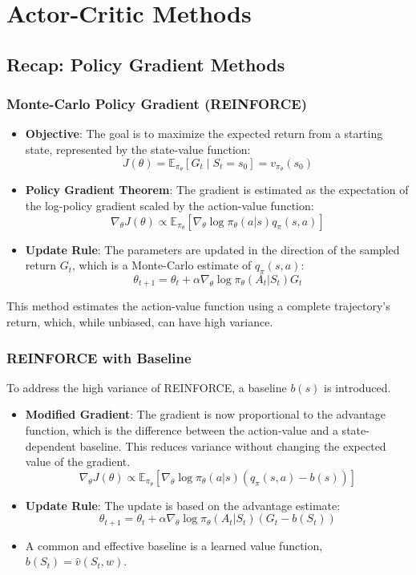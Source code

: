 \documentclass[12pt]{article}
\begin{document}
\section{Actor-Critic Methods }

\subsection{Recap: Policy Gradient Methods}

\subsubsection{Monte-Carlo Policy Gradient (REINFORCE)}
\begin{itemize}
    \item \textbf{Objective}: The goal is to maximize the expected return from a starting state, represented by the state-value function:
    $$ J(\theta) = \mathbb{E}_{\pi_\theta}[G_t \mid S_t = s_0] = v_{\pi_\theta}(s_0) $$
    \item \textbf{Policy Gradient Theorem}: The gradient is estimated as the expectation of the log-policy gradient scaled by the action-value function:
    $$ \nabla_\theta J(\theta) \propto \mathbb{E}_{\pi_\theta} [\nabla_\theta \log \pi_\theta(a|s) q_\pi(s,a)] $$
    \item \textbf{Update Rule}: The parameters are updated in the direction of the sampled return $G_t$, which is a Monte-Carlo estimate of $q_\pi(s,a)$:
    $$ \theta_{t+1} = \theta_t + \alpha \nabla_\theta \log \pi_\theta(A_t|S_t) G_t $$
\end{itemize}
This method estimates the action-value function using a complete trajectory's return, which, while unbiased, can have high variance.

\subsubsection{REINFORCE with Baseline}
To address the high variance of REINFORCE, a baseline $b(s)$ is introduced.
\begin{itemize}
    \item \textbf{Modified Gradient}: The gradient is now proportional to the advantage function, which is the difference between the action-value and a state-dependent baseline. This reduces variance without changing the expected value of the gradient.
    $$ \nabla_\theta J(\theta) \propto \mathbb{E}_{\pi_\theta} [\nabla_\theta \log \pi_\theta(a|s) (q_\pi(s,a) - b(s))] $$
    \item \textbf{Update Rule}: The update is based on the advantage estimate:
    $$ \theta_{t+1} = \theta_t + \alpha \nabla_\theta \log \pi_\theta(A_t|S_t) (G_t - b(S_t)) $$
    \item A common and effective baseline is a learned value function, $b(S_t) = \hat{v}(S_t, w)$.
\end{itemize}
\end{document}
